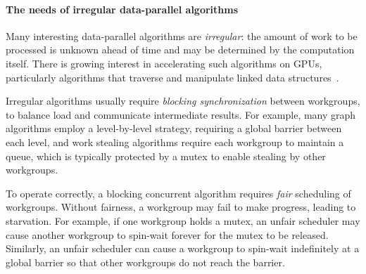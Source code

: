 \documentclass[numbers,nocopyrightspace,10pt]{sigplanconf}
\begin{document}
\paragraph{The needs of irregular data-parallel algorithms}
Many
interesting data-parallel algorithms are \emph{irregular}: the amount
of work to be processed is unknown ahead of time and may be determined
by the computation itself.  There is growing interest in accelerating such algorithms on GPUs, particularly algorithms that
traverse and manipulate linked data structures~\cite{owens-persistent,DBLP:conf/ipps/KaleemVPHP16,DBLP:conf/ipps/DavidsonBGO14,DBLP:conf/hipc/HarishN07,DBLP:journals/topc/MerrillGG15,DBLP:conf/egh/VineetHPN09,DBLP:conf/ppopp/NobariCKB12,DBLP:conf/hpcc/SolomonTT10a,DBLP:conf/popl/PrabhuRMH11,DBLP:conf/ppopp/Mendez-LojoBP12,DBLP:conf/oopsla/PaiP16,DBLP:conf/oopsla/SorensenDBGR16,DBLP:conf/egh/CedermanT08,TPO10,BNP12,Pannotia}.

Irregular algorithms usually require \emph{blocking synchronization}
between workgroups, to balance load and communicate intermediate
results.  For example, many graph algorithms employ a level-by-level strategy, requiring a global barrier between each level, and 
work stealing algorithms require each workgroup
to maintain a queue, which is typically protected by a mutex to enable
stealing by other workgroups.

To operate correctly, a blocking concurrent algorithm requires
\emph{fair} scheduling of workgroups.  Without fairness, a
workgroup may fail to make progress, leading to starvation.  For
example, if one workgroup holds a mutex, an unfair scheduler may cause
another workgroup to spin-wait forever for the mutex to be
released.  Similarly, an unfair scheduler can cause a workgroup to spin-wait
indefinitely at a global barrier so that other workgroups do not reach the barrier.
\end{document}

